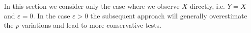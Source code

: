 \documentclass[preprint,aos]{imsart}
\numberwithin{equation}{section}
\theoremstyle{remark}
\DeclareMathOperator{\Var}{Var} \DeclareMathOperator{\Cov}{Cov}
\providecommand{\eps}{\varepsilon}
\providecommand{\norm}[1]{\lVert #1 \rVert}
\providecommand{\mr}{\color{blue}}
\begin{document}

In this section we consider only the case where we observe $X$ directly, i.e. $Y=X$ and $\eps=0$. In the case  $\eps>0$ the subsequent approach will generally overestimate the $p$-variations and  lead to more conservative tests.


\begin{comment}
We shall prove the following points below (spectral gap case):
\begin{enumerate}
\item The term $L^2 h^{2\beta}$ becomes $\frac h3 NQV$ with $NQV:=\int_0^1\rho_2(\Gamma(t))dt$, cf. Proposition \ref{PropNQV}.

\item We can estimate $NQV$ by
\[ \widehat{NQV}:=\frac32\sum_{k=0}^{(3h')^{-1}-1} \norm{\hat\Sigma_X^{(3k+2)h'}-2\hat\Sigma_X^{(3k+1)h'}+\hat\Sigma_X^{3kh'}}^2.\]
 For $h'\gg n^{-1/3}$ we have a CLT as $h'\to 0$
\[ (h')^{-1/2}\big(\widehat{NQV}-NQV\big)\xrightarrow{d} N\Big(0,3\int_0^1 \big(\rho_4(\Gamma(t))-\rho_2(\Gamma(t))^2\big)\,dt \Big),\]
cf. Theorem \ref{ThmNQVCLT}.

\item The variance term  can be estimated via
\begin{align*}
\int_0^1 \widehat{\rho_4(\Gamma(t))}\,dt &= \frac3{4h'}\sum_{k=0}^{(3h')^{-1}-1} \norm{\hat\Sigma_X^{(3k+2)h'}-2\hat\Sigma_X^{(3k+1)h'}+\hat\Sigma_X^{3kh'}}^4,\\
\int_0^1 \widehat{\rho_2(\Gamma(t))^2}\,dt &= \frac6{4h'}\sum_{k=0}^{(6h')^{-1}-1} \norm{\hat\Sigma_X^{(3k+2)h'}-2\hat\Sigma_X^{(3k+1)h'}+\hat\Sigma_X^{3kh'}}^2 \norm{\hat\Sigma_X^{(3k+5)h'}-2\hat\Sigma_X^{(3k+4)h'}+\hat\Sigma_X^{(3k+3)h'}}^2,
\end{align*}
cf. Proposition \ref{PropVarhat}.

\item Asymptotic critical value based on $\frac h3\widehat{NQV}$ plus term of order $h(nh)^{-1/2}$  plus quantile of order $h(h')^{1/2}$ from $\widehat{NQV}$. For $h'h\gg n^{-1}$ the term $h(nh)^{-1/2}$ becomes negligible and we are left with the terms due to $\widehat{NQV}$. Recommendation: choose $h\to 0$ with $nh\to\infty$ slowly, e.g. $h=n^{-1+2\eps}$, and then $h'$ quite large, e.g. $h'=n^{-\eps}$. For dimension dependence note $\rho_p(\Gamma)\thicksim d^{p/2}$, hence $NQV,\widehat{NQV}\thicksim d$ (natural quadratic order in $\sqrt d$ for spectral gap case).

\item {\mr TO DO:} estimation of $\underline\lambda_r$; THEN STOP!

\end{enumerate}
\end{comment}
\end{document}
